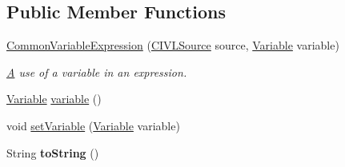 \subsection*{Public Member Functions}
\begin{DoxyCompactItemize}
\item 
\hyperlink{classedu_1_1udel_1_1cis_1_1vsl_1_1civl_1_1model_1_1common_1_1expression_1_1CommonVariableExpression_a9c515ef459e58aa63970da1a416c89ca}{Common\+Variable\+Expression} (\hyperlink{interfaceedu_1_1udel_1_1cis_1_1vsl_1_1civl_1_1model_1_1IF_1_1CIVLSource}{C\+I\+V\+L\+Source} source, \hyperlink{interfaceedu_1_1udel_1_1cis_1_1vsl_1_1civl_1_1model_1_1IF_1_1variable_1_1Variable}{Variable} variable)
\begin{DoxyCompactList}\small\item\em \hyperlink{structA}{A} use of a variable in an expression. \end{DoxyCompactList}\item 
\hyperlink{interfaceedu_1_1udel_1_1cis_1_1vsl_1_1civl_1_1model_1_1IF_1_1variable_1_1Variable}{Variable} \hyperlink{classedu_1_1udel_1_1cis_1_1vsl_1_1civl_1_1model_1_1common_1_1expression_1_1CommonVariableExpression_a88afb7e267a638c463a2ec30dbfe13ea}{variable} ()
\item 
void \hyperlink{classedu_1_1udel_1_1cis_1_1vsl_1_1civl_1_1model_1_1common_1_1expression_1_1CommonVariableExpression_ad41e0d58eb692e499c920059fb9618ac}{set\+Variable} (\hyperlink{interfaceedu_1_1udel_1_1cis_1_1vsl_1_1civl_1_1model_1_1IF_1_1variable_1_1Variable}{Variable} variable)
\item 
\hypertarget{classedu_1_1udel_1_1cis_1_1vsl_1_1civl_1_1model_1_1common_1_1expression_1_1CommonVariableExpression_a40affbb395b298f5dbb9512bab4b1a87}{}String {\bfseries to\+String} ()\label{classedu_1_1udel_1_1cis_1_1vsl_1_1civl_1_1model_1_1common_1_1expression_1_1CommonVariableExpression_a40affbb395b298f5dbb9512bab4b1a87}


\end{DoxyCompactItemize}
